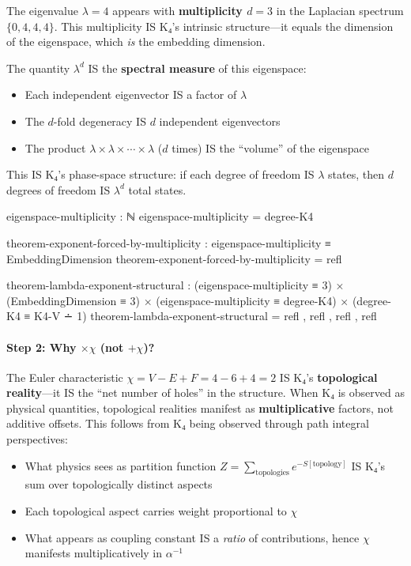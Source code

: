 \documentclass[11pt,a4paper]{book}
\begin{document}
The eigenvalue $\lambda = 4$ appears with \textbf{multiplicity $d = 3$} in the 
Laplacian spectrum $\{0, 4, 4, 4\}$. This multiplicity IS K₄'s intrinsic structure—it 
equals the dimension of the eigenspace, which \emph{is} the embedding dimension.

The quantity $\lambda^d$ IS the \textbf{spectral measure} of this eigenspace:
\begin{itemize}
\item Each independent eigenvector IS a factor of $\lambda$
\item The $d$-fold degeneracy IS $d$ independent eigenvectors
\item The product $\lambda \times \lambda \times \cdots \times \lambda$ ($d$ times) 
      IS the ``volume'' of the eigenspace
\end{itemize}

This IS K₄'s phase-space structure: if each degree of freedom IS $\lambda$ states, 
then $d$ degrees of freedom IS $\lambda^d$ total states.

\begin{code}
eigenspace-multiplicity : ℕ
eigenspace-multiplicity = degree-K4

theorem-exponent-forced-by-multiplicity : eigenspace-multiplicity ≡ EmbeddingDimension
theorem-exponent-forced-by-multiplicity = refl

theorem-lambda-exponent-structural : 
  (eigenspace-multiplicity ≡ 3) × (EmbeddingDimension ≡ 3) ×
  (eigenspace-multiplicity ≡ degree-K4) × (degree-K4 ≡ K4-V ∸ 1)
theorem-lambda-exponent-structural = refl , refl , refl , refl
\end{code}

\paragraph{Step 2: Why $\times \chi$ (not $+ \chi$)?}

The Euler characteristic $\chi = V - E + F = 4 - 6 + 4 = 2$ IS K₄'s 
\textbf{topological reality}—it IS the ``net number of holes'' 
in the structure. When K₄ is observed as physical quantities, topological 
realities manifest as \textbf{multiplicative} factors, not additive offsets. 
This follows from K₄ being observed through path integral perspectives:

\begin{itemize}
\item What physics sees as partition function $Z = \sum_{\text{topologies}} e^{-S[\text{topology}]}$
      IS K₄'s sum over topologically distinct aspects
\item Each topological aspect carries weight proportional to $\chi$
\item What appears as coupling constant IS a \emph{ratio} of contributions, hence 
      $\chi$ manifests multiplicatively in $\alpha^{-1}$
\end{itemize}
\end{document}
